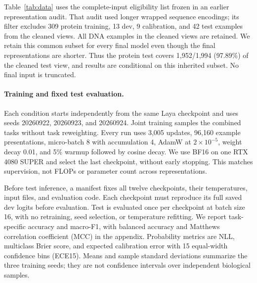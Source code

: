 Table~\ref{tab:data} uses the complete-input eligibility list frozen in an earlier representation audit. That audit used longer wrapped sequence encodings; its filter excludes 309 protein training, 13 dev, 9 calibration, and 42 test examples from the cleaned views. All DNA examples in the cleaned views are retained. We retain this common subset for every final model even though the final representations are shorter. Thus the protein test covers 1,952/1,994 (97.89\%) of the cleaned test view, and results are conditional on this inherited subset. No final input is truncated.

\paragraph{Training and fixed test evaluation.}
Each condition starts independently from the same Laya checkpoint and uses seeds 20260922, 20260923, and 20260924. Joint training samples the combined tasks without task reweighting. Every run uses 3,005 updates, 96,160 example presentations, micro-batch 8 with accumulation 4, AdamW at $2\times10^{-5}$, weight decay 0.01, and 5\% warmup followed by cosine decay. We use BF16 on one RTX 4080 SUPER and select the last checkpoint, without early stopping. This matches supervision, not FLOPs or parameter count across representations.

Before test inference, a manifest fixes all twelve checkpoints, their temperatures, input files, and evaluation code. Each checkpoint must reproduce its full saved dev logits before evaluation. Test is evaluated once per checkpoint at batch size 16, with no retraining, seed selection, or temperature refitting. We report task-specific accuracy and macro-F1, with balanced accuracy and Matthews correlation coefficient (MCC) in the appendix. Probability metrics are NLL, multiclass Brier score, and expected calibration error with 15 equal-width confidence bins (ECE15). Means and sample standard deviations summarize the three training seeds; they are not confidence intervals over independent biological samples.
